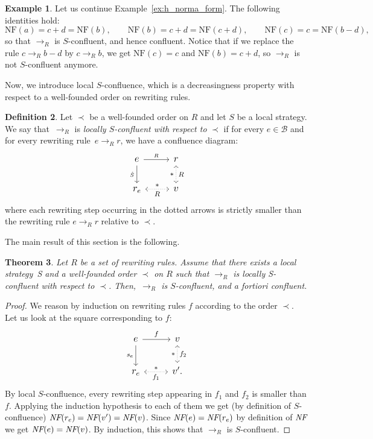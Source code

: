 \documentclass[10pt]{easychair}
\newtheorem{theorem}{Theorem}[section]
\theoremstyle{definition}
\newtheorem{definition}[theorem]{Definition}
\newtheorem{example}[theorem]{Example}
\newcommand\basis{\mathscr{B}}
\newcommand\rewR{\to_R}
\newcommand\NF{\text{NF}}
\newcommand\NFF{\emph{NF}}
\begin{document}
\begin{example}
  Let us continue Example~\ref{ex:h_norma_form}. The following identities
  hold:
  \[\NF(a)=c+d=\NF(b),\qquad\NF(b)=c+d=\NF(c+d),\qquad\NF(c)=c=\NF(b-d),
  \]
  so that $\rewR$ is $S$-confluent, and hence confluent. Notice that if
  we replace the rule $c\rewR b-d$ by $c\rewR b$, we get $\NF(c)=c$ and
  $\NF(b)=c+d$, so $\rewR$ is not $S$-confluent anymore. 
\end{example}
\smallskip

Now, we introduce local $S$-confluence, which is a decreasingness
property with respect to a well-founded order on rewriting rules.
\smallskip

\begin{definition}\label{def:decreasingness_property}
  Let $\prec$ be a well-founded order on $R$ and let $S$ be a local
  strategy. We say that~$\rewR$ is \emph{locally $S$-confluent with
    respect to} $\prec$ if for every $e\in\basis$ and for every rewriting
  rule~$e\rewR r$, we have a confluence diagram:
  \[\large\begin{tikzcd}
  e\ar[r, "_R"]\ar[d, "_{\hat{S}}"'] & r\ar[d, leftrightarrow, dotted, "*"', "R"]\\
  r_e\ar[r, leftrightarrow, dotted, "*", "R"'] & v
  \end{tikzcd}\]
  where each rewriting step occurring in the dotted arrows is strictly smaller
  than the rewriting rule $e\rewR r$ relative to $\prec$.
\end{definition}
\smallskip

The main result of this section is the following.
\medskip

\begin{theorem}\label{thm:confluence_criterion}
  Let $R$ be a set of rewriting rules. Assume that there exists a local
  strategy~S and a well-founded order $\prec$ on $R$ such that $\rewR$ is
  locally S-confluent with respect to $\prec$. Then,~$\rewR$ is
  $S$-confluent, and \emph{a fortiori} confluent. 
\end{theorem}

\begin{proof}
  We reason by induction on rewriting rules $f$ according to the order
  $\prec$. Let us look at the square corresponding to $f$:
  \[\large\begin{tikzcd}
  e\ar[r, "f"]\ar[d, "s_e"'] & v\ar[d, leftrightarrow, dotted, "*"', "f_2"]\\
  r_e\ar[r, leftrightarrow, dotted, "*", "f_1"'] & v'.
  \end{tikzcd}\]
  By local $S$-confluence, every rewriting step appearing
  in $f_1$ and $f_2$ is smaller than $f$.
  Applying the induction hypothesis to each of them we get
  (by definition of $S$-confluence) $\NFF(r_e) = \NFF(v') = \NFF(v)$.
  Since $\NFF(e) = \NFF(r_e)$ by definition of $\NFF$ we get $\NFF(e) = \NFF(v)$.
  By induction, this shows that $\rewR$ is $S$-confluent.
\end{proof}
\medskip
\end{document}
